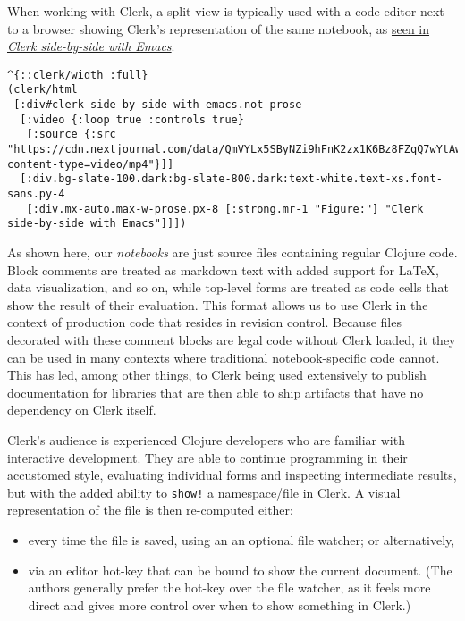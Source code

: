 \documentclass[
]{article}
\newcommand{\passthrough}[1]{#1}
\providecommand{\tightlist}{%
  \setlength{\itemsep}{0pt}\setlength{\parskip}{0pt}}
\begin{document}
When working with Clerk, a split-view is typically used with a code editor next to a browser showing Clerk's representation of the same notebook, as \protect\hyperlink{clerk-side-by-side-with-emacs}{seen in \emph{Clerk side-by-side with Emacs}}.

\begin{lstlisting}
^{::clerk/width :full}
(clerk/html
 [:div#clerk-side-by-side-with-emacs.not-prose
  [:video {:loop true :controls true}
   [:source {:src "https://cdn.nextjournal.com/data/QmVYLx5SByNZi9hFnK2zx1K6Bz8FZqQ7wYtAwzYCxEhvfh?content-type=video/mp4"}]]
  [:div.bg-slate-100.dark:bg-slate-800.dark:text-white.text-xs.font-sans.py-4
   [:div.mx-auto.max-w-prose.px-8 [:strong.mr-1 "Figure:"] "Clerk side-by-side with Emacs"]]])
\end{lstlisting}

As shown here, our \emph{notebooks} are just source files containing regular Clojure code. Block comments are treated as markdown text with added support for LaTeX, data visualization, and so on, while top-level forms are treated as code cells that show the result of their evaluation. This format allows us to use Clerk in the context of production code that resides in revision control. Because files decorated with these comment blocks are legal code without Clerk loaded, it they can be used in many contexts where traditional notebook-specific code cannot. This has led, among other things, to Clerk being used extensively to publish documentation for libraries that are then able to ship artifacts that have no dependency on Clerk itself.

Clerk's audience is experienced Clojure developers who are familiar with interactive development. They are able to continue programming in their accustomed style, evaluating individual forms and inspecting intermediate results, but with the added ability to \passthrough{\lstinline"show!"} a namespace/file in Clerk. A visual representation of the file is then re-computed either:

\begin{itemize}
\tightlist
\item
  every time the file is saved, using an an optional file watcher; or alternatively,
\item
  via an editor hot-key that can be bound to show the current document. (The authors generally prefer the hot-key over the file watcher, as it feels more direct and gives more control over when to show something in Clerk.)
\end{itemize}
\end{document}
